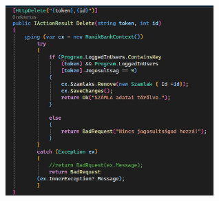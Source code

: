 \documentclass[colorlinks]{thesis-kando}
\theoremstyle{definition}
\theoremstyle{remark}
\begin{document}
\begin{itemize}
\begin{itemize}
    \\
    \includegraphics[width=8cm]{figures/szamlatorles.png}
\end{itemize}


\end{itemize}
\end{document}
